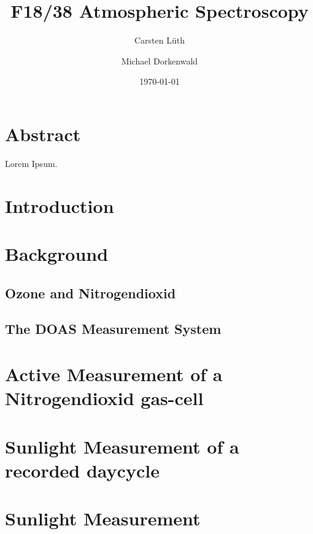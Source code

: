 \documentclass[12pt, english]{scrartcl} %
\title{F18/38 Atmospheric Spectroscopy}
\author{Carsten L{\"u}th \and Michael Dorkenwald}
\date{\today}
\begin{document}
\maketitle

\begin{multicols}{2}


\section{Abstract}
Lorem Ipsum.
\section{Introduction}




\section{Background}

\subsection{Ozone and Nitrogendioxid}

\subsection{The DOAS Measurement System}

\newpage

\section{Active Measurement of a Nitrogendioxid gas-cell}


\section{Sunlight Measurement of a recorded daycycle}

\section{Sunlight Measurement }

\end{multicols}
\end{document}
